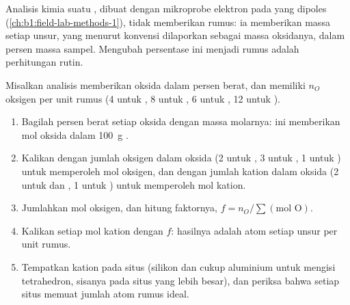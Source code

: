 Analisis kimia suatu , dibuat dengan mikroprobe elektron pada  yang dipoles (\cref{ch:b1:field-lab-methods-1}), tidak memberikan rumus: ia memberikan massa setiap unsur, yang menurut konvensi dilaporkan sebagai massa oksidanya, dalam persen massa sampel. Mengubah persentase ini menjadi rumus adalah perhitungan rutin.

\begin{method}\label{met:b1:rock-forming-minerals:recalculation}
Misalkan analisis memberikan oksida dalam persen berat, dan  memiliki
$n_O$ oksigen per unit rumus (4 untuk , 8 untuk , 6 untuk
, 12 untuk ).
\begin{enumerate}
  \item Bagilah persen berat setiap oksida dengan massa molarnya: ini memberikan mol oksida dalam \qty{100}{g} .
  \item Kalikan dengan jumlah oksigen dalam oksida (2 untuk , 3 untuk , 1 untuk ) untuk memperoleh mol oksigen, dan dengan jumlah kation dalam oksida (2 untuk  dan , 1 untuk ) untuk memperoleh mol kation.
  \item Jumlahkan mol oksigen, dan hitung faktornya,
        $f = n_O / \sum(\text{mol O})$.
  \item Kalikan setiap mol kation dengan $f$: hasilnya adalah atom setiap unsur per unit rumus.
  \item Tempatkan kation pada situs (silikon dan cukup aluminium untuk mengisi tetrahedron, sisanya pada situs yang lebih besar), dan periksa bahwa setiap situs memuat jumlah atom rumus ideal.
\end{enumerate}
\end{method}

